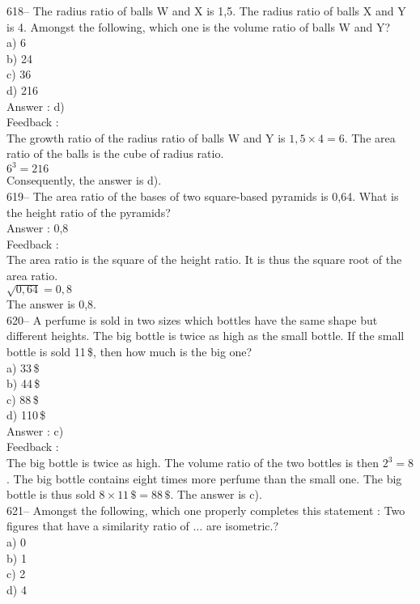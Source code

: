 \documentclass[letterpaper, 12pt]{article}
\begin{document}
618-- The radius ratio of balls W and X is 1,5. The radius ratio of balls X and Y is 4. Amongst the following, which one is the volume ratio of balls W and Y?\\
a) 6\\
b) 24\\
c) 36\\
d) 216\\

Answer : d)\\

Feedback : \\
The growth ratio of the radius ratio of balls W and Y is $1,5\times4=6$. The area ratio of the balls is the cube of radius ratio.\\
$6^{3}=216$  \\
Consequently, the answer is d).\\

619-- The area ratio of the bases of two square-based pyramids is 0,64. What is the height ratio of the pyramids? \\

Answer : 0,8\\

Feedback : \\
The area ratio is the square of the height ratio. It is thus the square root of the area ratio.  \\
$\sqrt{0,64}=0,8$  \\
The answer is 0,8.\\


620-- A perfume is sold in two sizes which bottles have the same shape but different heights. The big bottle is twice as high as the small bottle. If the small bottle is sold 11\,\$,
then how much is the big one?\\
a) 33\,\$\\
b) 44\,\$\\
c) 88\,\$\\
d) 110\,\$\\

Answer : c)\\

Feedback : \\
The big bottle is twice as high. The volume ratio of the two bottles is then $2^{3}=8$. The big bottle contains eight times more perfume than the small one. The big bottle is thus sold $8\times11\,\$=88\,\$$.  The answer is c).\\


621-- Amongst the following, which one properly completes this statement : \og Two figures that have a similarity ratio of  $\ldots$ are isometric.\fg?\\
a) 0\\
b) 1\\
c) 2\\
d) 4\\
\end{document}
